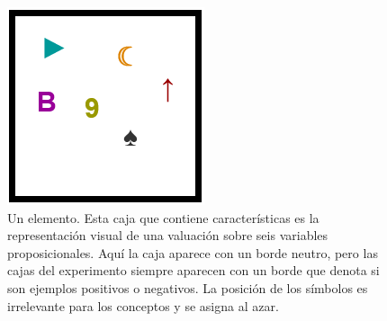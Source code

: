 \begin{figure}[h!] 
\begin{center}
    \includegraphics[scale=0.6]{papers/images_behavior_research_methods/BordeNeutro.PNG}
	\caption{
	Un elemento. Esta caja que contiene características es la representación visual de una valuación sobre seis variables proposicionales. Aquí la caja aparece con un borde neutro, pero las cajas del experimento siempre aparecen con un borde que denota si son ejemplos positivos o negativos. La posición de los símbolos es irrelevante para los conceptos y se asigna al azar.}
	\label{Figure:element} 
\end{center}
\end{figure}


